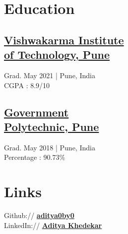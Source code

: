 \documentclass[]{deedy-resume-openfont}
\begin{document}
%
%
\lastupdated

%
%

%
%

\begin{minipage}[t]{0.33\textwidth} 


\section{Education}  
\vspace{5pt}
\subsection{\href{https://www.vit.edu/}{Vishwakarma Institute \\of Technology, Pune}}
Grad. May 2021 | Pune, India\\
CGPA : 8.9/10
\sectionsep


\subsection{\href{https://gppune.ac.in/userindex.php}{Government \\Polytechnic, Pune}}
Grad. May 2018 | Pune, India\\
Percentage : 90.73\%
\sectionsep


\section{Links} 
\vspace{5pt}

Github:// \href{https://github.com/aditya0by0}{\bf aditya0by0} \\

LinkedIn://  \href{https://www.linkedin.com/in/aditya-khedekar-b1979013b/}{\bf Aditya Khedekar} 


\end{minipage}
\end{document}
